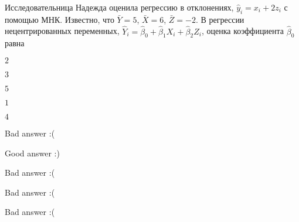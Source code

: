 
\begin{question}
Исследовательница Надежда оценила регрессию в отклонениях, \(\hat y_i =  x_i + 2 z_i\) с помощью МНК.
Известно, что \(\bar Y=5\), \(\bar X =6\), \(\bar Z=-2\).
В регрессии нецентрированных переменных, \(\hat Y_i = \hat \beta_0 + \hat \beta_1 X_i + \hat \beta_2 Z_i\),
оценка коэффициента \(\hat \beta_0\) равна
\begin{answerlist}
  \item \(2\)
  \item \(3\)
  \item \(5\)
  \item \(1\)
  \item \(4\)
\end{answerlist}
\end{question}

\begin{solution}
\begin{answerlist}
  \item Bad answer :(
  \item Good answer :)
  \item Bad answer :(
  \item Bad answer :(
  \item Bad answer :(
\end{answerlist}
\end{solution}

